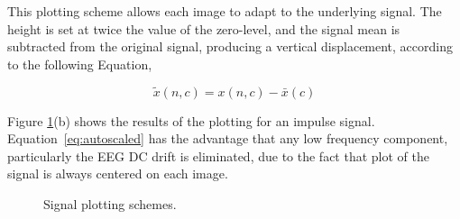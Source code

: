 This plotting scheme allows each image to adapt to the underlying signal.  The height is set at twice the value of the zero-level, and the signal mean is subtracted from the original signal, producing a vertical displacement, according to the following Equation,

\begin{equation}
\tilde{x}(n,c) =  x(n,c) - \bar{x}(c) 
\label{eq:autoscaled}
\end{equation}

Figure \ref{fig:plottingscheme}(b) shows the results of the plotting for an impulse signal.  Equation~\ref{eq:autoscaled} has the advantage that any low frequency component, particularly the EEG DC drift is eliminated, due to the fact that plot of the signal is always centered on each image.

\begin{figure}[htb]
\centering
{}
\caption[Signal plot of an impulse response]{Signal plotting schemes.}
\label{fig:plottingscheme}
\end{figure}

